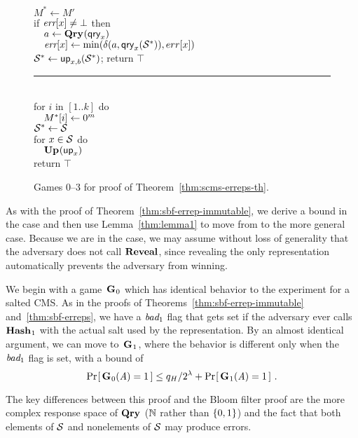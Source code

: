 \begin{figure*}
{    $M^* \gets M'$\\
    if $\textit{err}[x] \neq \bot$ then\\
      $\hspace*{10pt} a \gets \textup{\textbf{Qry}}\hspace{0.5pt}(\mathsf{qry}_x)$\\
      $\hspace*{10pt}\textit{err}[x] \gets \min(\delta(a,\mathsf{qry}_x(\mathcal{S}^*)),err[x])$\\
    $\mathcal{S}^* \gets \mathsf{up}_{x,b}(\mathcal{S}^*)$;
    return $\top$
  \vspace{6pt}\hrule\vspace{3pt}
  \oraclev{$\REPO(\col)$}\hfill{}\\[2pt]
    for $i$ in $[1..k]$ do\\
      $\hspace*{10pt} M^*[i] \gets 0^m$\\
    $\mathcal{S}^* \gets \mathcal{S}$\\
    for $x \in \mathcal{S}$ do\\
    $\hspace*{10pt}\textup{\textbf{Up}}\hspace{0.5pt}(\mathsf{up}_x)$\\
    return $\top$
}
\caption{Games 0--3 for proof of Theorem~\ref{thm:scms-erreps-th}.}
\label{fig:sbf-erreps/games}
\end{figure*}

As with the proof of Theorem~\ref{thm:sbf-errep-immutable}, we derive a bound in
the  case and then use Lemma~\ref{thm:lemma1} to move from  to
the more general \erreps case. Because we are in the  case, we may
assume without loss of generality that the adversary does not call $\mathbf{Reveal}$,
since revealing the only representation automatically prevents the adversary
from winning.

We begin with a game~$\textup{\textbf{G}}\hspace{0.5pt}_0$ which has identical behavior to the 
experiment for a salted CMS. As in the proofs of
Theorems~\ref{thm:sbf-errep-immutable} and~\ref{thm:sbf-erreps}, we have a
$\textit{bad}_1$ flag that gets set if the adversary ever calls $\textup{\textbf{Hash}}\hspace{0.5pt}_1$ with the
actual salt used by the representation. By an almost identical argument, we can
move to~$\textup{\textbf{G}}\hspace{0.5pt}_1$, where the behavior is different only when the $\textit{bad}_1$ flag
is set, with a bound of
\begin{equation}
  \Pr\hspace{-1pt}\left[\,\textup{\textbf{G}}\hspace{0.5pt}_0(\mathit{A})=1\,\right] \leq
    q_H/2^\lambda + \Pr\hspace{-1pt}\left[\,\textup{\textbf{G}}\hspace{0.5pt}_1(\mathit{A})=1\,\right] \,.
\end{equation}

The key differences between this proof and the Bloom filter proof are the more
complex response space of $\textup{\textbf{Qry}}\hspace{0.5pt}$ ($\mathbb{N}$ rather than $\{0,1\}$) and the fact that
both elements of $\mathcal{S}$ and nonelements of $\mathcal{S}$ may produce errors.

